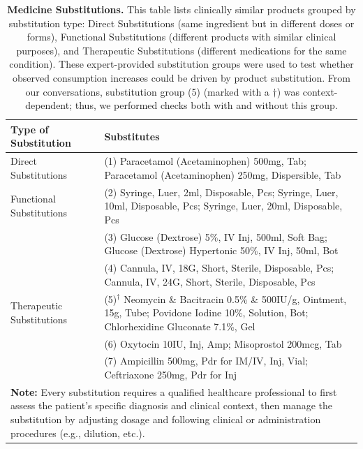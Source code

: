 \documentclass[12pt]{article}
\begin{document}
\begin{table}[t]
\centering \small
\caption{\textbf{Medicine Substitutions.} This table lists clinically similar products grouped by substitution type: Direct Substitutions (same ingredient but in different doses or forms), Functional Substitutions (different products with similar clinical purposes), and Therapeutic Substitutions (different medications for the same condition). These expert-provided substitution groups were used to test whether observed consumption increases could be driven by product substitution. From our conversations, substitution group (5) (marked with a $\dagger$) was context-dependent; thus, we performed checks both with and without this group.}
\begin{tabular}{l p{10cm}}
\toprule
Type of Substitution & Substitutes \\
\midrule
Direct Substitutions & (1) Paracetamol (Acetaminophen) 500mg, Tab; Paracetamol (Acetaminophen) 250mg, Dispersible, Tab \\
\addlinespace
Functional Substitutions & (2) Syringe, Luer, 2ml, Disposable, Pcs; Syringe, Luer, 10ml, Disposable, Pcs; Syringe, Luer, 20ml, Disposable, Pcs \\ & (3) Glucose (Dextrose) 5\%, IV Inj, 500ml, Soft Bag; Glucose (Dextrose) Hypertonic 50\%, IV Inj, 50ml, Bot \\ & (4) Cannula, IV, 18G, Short, Sterile, Disposable, Pcs; Cannula, IV, 24G, Short, Sterile, Disposable, Pcs \\
\addlinespace
Therapeutic Substitutions & (5)$^\dagger$ Neomycin \& Bacitracin 0.5\% \& 500IU/g, Ointment, 15g, Tube; Povidone Iodine 10\%, Solution, Bot; Chlorhexidine Gluconate 7.1\%, Gel \\ & (6) Oxytocin 10IU, Inj, Amp; Misoprostol 200mcg, Tab \\ & (7) Ampicillin 500mg, Pdr for IM/IV, Inj, Vial; Ceftriaxone 250mg, Pdr for Inj \\
\midrule
\multicolumn{2}{p{15.5cm}}{\small{\textbf{Note:} Every substitution requires a qualified healthcare professional to first assess the patient's specific diagnosis and clinical context, then manage the substitution by adjusting dosage and following clinical or administration procedures (e.g., dilution, etc.).}} \\
\bottomrule
\end{tabular}
\label{tab:sublist}
\end{table}
\end{document}
